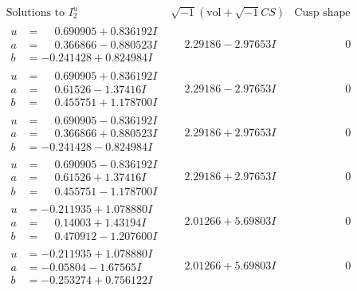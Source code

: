 \documentclass[1p]{elsarticle_modified}
\theoremstyle{definition}
\newcommand{\I}{\sqrt{-1}}
\begin{document}
$$\begin{array}{c|c|c}  
\text{Solutions to }I^u_{2}& \I (\text{vol} + \sqrt{-1}CS) & \text{Cusp shape}\\
 \hline 
\begin{aligned}
u &= \phantom{-}0.690905 + 0.836192 I \\
a &= \phantom{-}0.366866 - 0.880523 I \\
b &= -0.241428 + 0.824984 I\end{aligned}
 & \phantom{-}2.29186 - 2.97653 I & \phantom{-0.000000 } 0 \\ \hline\begin{aligned}
u &= \phantom{-}0.690905 + 0.836192 I \\
a &= \phantom{-}0.61526 - 1.37416 I \\
b &= \phantom{-}0.455751 + 1.178700 I\end{aligned}
 & \phantom{-}2.29186 - 2.97653 I & \phantom{-0.000000 } 0 \\ \hline\begin{aligned}
u &= \phantom{-}0.690905 - 0.836192 I \\
a &= \phantom{-}0.366866 + 0.880523 I \\
b &= -0.241428 - 0.824984 I\end{aligned}
 & \phantom{-}2.29186 + 2.97653 I & \phantom{-0.000000 } 0 \\ \hline\begin{aligned}
u &= \phantom{-}0.690905 - 0.836192 I \\
a &= \phantom{-}0.61526 + 1.37416 I \\
b &= \phantom{-}0.455751 - 1.178700 I\end{aligned}
 & \phantom{-}2.29186 + 2.97653 I & \phantom{-0.000000 } 0 \\ \hline\begin{aligned}
u &= -0.211935 + 1.078880 I \\
a &= \phantom{-}0.14003 + 1.43194 I \\
b &= \phantom{-}0.470912 - 1.207600 I\end{aligned}
 & \phantom{-}2.01266 + 5.69803 I & \phantom{-0.000000 } 0 \\ \hline\begin{aligned}
u &= -0.211935 + 1.078880 I \\
a &= -0.05804 - 1.67565 I \\
b &= -0.253274 + 0.756122 I\end{aligned}
 & \phantom{-}2.01266 + 5.69803 I & \phantom{-0.000000 } 0 \\ \hline\begin{aligned}

\end{aligned}
\end{array}$$
\end{document}
